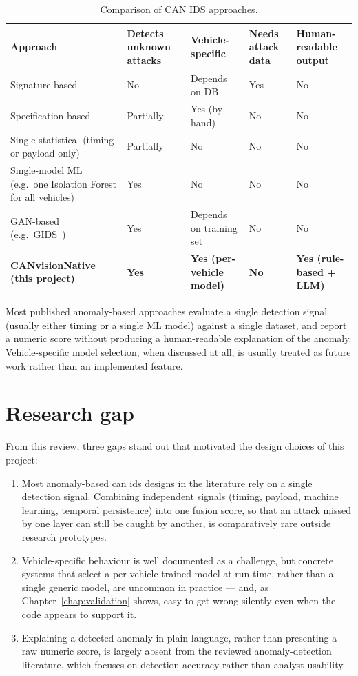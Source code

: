 \begin{table}[H]
\centering
\caption{Comparison of CAN IDS approaches.}
\label{tab:sota-comparison}
\begin{tabularx}{\textwidth}{@{}lXXXX@{}}
\toprule
\textbf{Approach} & \textbf{Detects unknown attacks} & \textbf{Vehicle-specific} & \textbf{Needs attack data} & \textbf{Human-readable output} \\
\midrule
Signature-based & No & Depends on DB & Yes & No \\
Specification-based & Partially & Yes (by hand) & No & No \\
Single statistical (timing or payload only) & Partially & No & No & No \\
Single-model ML (e.g.\ one Isolation Forest for all vehicles) & Yes & No & No & No \\
GAN-based (e.g.\ GIDS~\cite{seo2018gids}) & Yes & Depends on training set & No & No \\
\textbf{CANvisionNative (this project)} & \textbf{Yes} & \textbf{Yes (per-vehicle model)} & \textbf{No} & \textbf{Yes (rule-based + LLM)} \\
\bottomrule
\end{tabularx}
\end{table}

Most published anomaly-based approaches evaluate a single detection signal (usually either timing or a single ML model) against a single dataset, and report a numeric score without producing a human-readable explanation of the anomaly. Vehicle-specific model selection, when discussed at all, is usually treated as future work rather than an implemented feature.

\section{Research gap}

From this review, three gaps stand out that motivated the design choices of this project:

\begin{enumerate}
    \item Most anomaly-based \gls{can} \gls{ids} designs in the literature rely on a single detection signal. Combining independent signals (timing, payload, machine learning, temporal persistence) into one fusion score, so that an attack missed by one layer can still be caught by another, is comparatively rare outside research prototypes.
    \item Vehicle-specific behaviour is well documented as a challenge, but concrete systems that select a per-vehicle trained model at run time, rather than a single generic model, are uncommon in practice — and, as Chapter~\ref{chap:validation} shows, easy to get wrong silently even when the code appears to support it.
    \item Explaining a detected anomaly in plain language, rather than presenting a raw numeric score, is largely absent from the reviewed anomaly-detection literature, which focuses on detection accuracy rather than analyst usability.
\end{enumerate}

